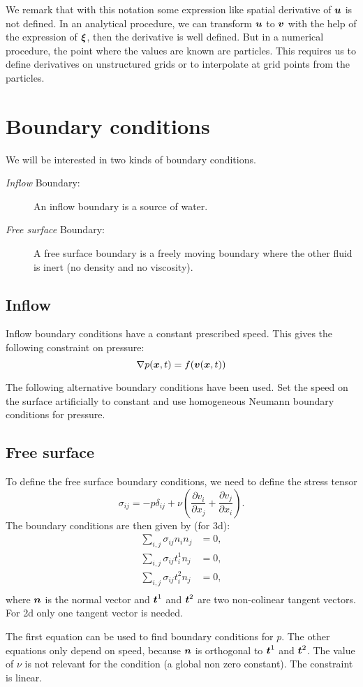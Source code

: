 \begin{remark}
We remark that with this notation some expression like spatial derivative of ${\boldsymbol {u}}$ is not defined.
In an analytical procedure, we can transform ${\boldsymbol {u}}$ to ${\boldsymbol {v}}$ with the help of the expression of ${\boldsymbol {\xi}}$, then the derivative is well defined.
But in a numerical procedure, the point where the values are known are particles. This requires us to define derivatives on unstructured grids
or to interpolate at grid points from the particles.
\end{remark}

\section{Boundary conditions}

We will be interested in two kinds of boundary conditions.
\begin{description}
 \item[\emph{Inflow} Boundary:]
 An inflow boundary is a source of water.
 \item[\emph{Free surface} Boundary:]
 A free surface boundary is a freely moving boundary where the other fluid is inert (no density and no viscosity).
\end{description}

\subsection{Inflow}

Inflow boundary conditions have a constant prescribed speed.
This gives the following constraint on pressure:
\begin{equation}
\nabla p({\boldsymbol {x}},t)=f({\boldsymbol {v}}({\boldsymbol {x}},t))
\end{equation}

The following alternative boundary conditions have been used.
Set the speed on the surface artificially to constant and use homogeneous Neumann boundary conditions for pressure.


\subsection{Free surface}
\label{ana:free:surface}
To define the free surface boundary conditions, we need to define the stress tensor
\begin{equation}
	\sigma_{ij}=-p \delta_{ij}+\nu\left(\frac{\partial v_{i}}{\partial x_{j}}+\frac{\partial v_{j}}{\partial x_{i}}\right).
\end{equation}
The boundary conditions are then given by (for 3d):
\begin{align}
	\sum_{i,j}\sigma_{ij}n_{i}n_{j}&=0,\\
	\sum_{i,j}\sigma_{ij}t^{1}_{i}n_{j}&=0,\\
	\sum_{i,j}\sigma_{ij}t^{2}_{i}n_{j}&=0,\\
\end{align}
where ${\boldsymbol {n}}$ is the normal vector and ${\boldsymbol {t}}^1$ and ${\boldsymbol {t}}^2$ are two non-colinear tangent vectors.
For 2d only one tangent vector is needed.

The first equation can be used to find boundary conditions for $p$.
The other equations only depend on speed, because ${\boldsymbol {n}}$ is orthogonal to ${\boldsymbol {t}}^{1}$ and ${\boldsymbol {t}}^{2}$.
The value of $\nu$ is not relevant for the condition (a global non zero constant).
The constraint is linear.